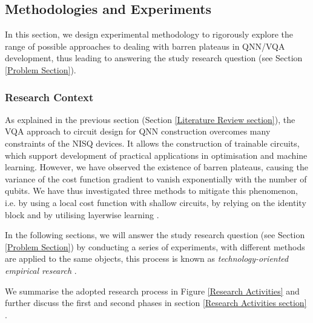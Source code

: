 \subsection{Methodologies and Experiments}
In this section, we design experimental methodology to rigorously explore the range of possible approaches to dealing with barren plateaus in QNN/VQA development, thus leading to answering the study research question (see Section \ref{Problem Section}).

\subsubsection{Research Context}

As explained in the previous section (Section \ref{Literature Review section}), the VQA approach to circuit design for QNN construction overcomes many constraints of the NISQ devices. It allows the construction of trainable circuits, which support development of practical applications in optimisation and machine learning.
However, we have observed the existence of barren plateaus, causing the variance of the cost function gradient to vanish exponentially with the number of qubits.
We have thus investigated three methods to mitigate this phenomenon, i.e. by using a local cost function with shallow circuits, by relying on the identity block and by utilising layerwise learning \cite{cerezoCostFunctionDependent2021, liuParameterInitializationMethod2021, skolikLayerwiseLearningQuantum2021}.

In the following sections, we will answer the study research question (see Section \ref{Problem Section}) by conducting a series of experiments, with different methods are applied to the same objects, this process is known as \emph{technology-oriented empirical research} \cite{wohlinExperimentationSoftwareEngineering2012}.

We summarise the adopted research process in Figure \ref{Research Activities} and further discuss the first and second phases in section \ref{Research Activities section} 
.

